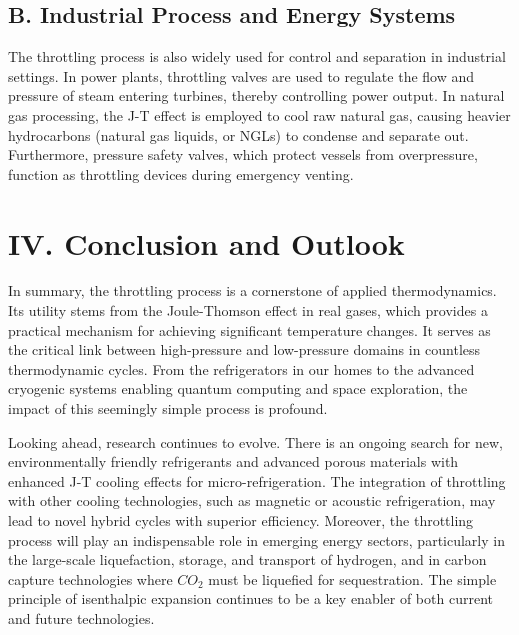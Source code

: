 \documentclass[aps,prl,reprint,groupedaddress]{revtex4-2}
\begin{document}
\subsection{B. Industrial Process and Energy Systems}
The throttling process is also widely used for control and separation in industrial settings. In power plants, throttling valves are used to regulate the flow and pressure of steam entering turbines, thereby controlling power output. In natural gas processing, the J-T effect is employed to cool raw natural gas, causing heavier hydrocarbons (natural gas liquids, or NGLs) to condense and separate out. Furthermore, pressure safety valves, which protect vessels from overpressure, function as throttling devices during emergency venting.

\section{IV. Conclusion and Outlook}
In summary, the throttling process is a cornerstone of applied thermodynamics. Its utility stems from the Joule-Thomson effect in real gases, which provides a practical mechanism for achieving significant temperature changes. It serves as the critical link between high-pressure and low-pressure domains in countless thermodynamic cycles. From the refrigerators in our homes to the advanced cryogenic systems enabling quantum computing and space exploration, the impact of this seemingly simple process is profound.

Looking ahead, research continues to evolve. There is an ongoing search for new, environmentally friendly refrigerants and advanced porous materials with enhanced J-T cooling effects for micro-refrigeration. The integration of throttling with other cooling technologies, such as magnetic or acoustic refrigeration, may lead to novel hybrid cycles with superior efficiency. Moreover, the throttling process will play an indispensable role in emerging energy sectors, particularly in the large-scale liquefaction, storage, and transport of hydrogen, and in carbon capture technologies where $CO_2$ must be liquefied for sequestration. The simple principle of isenthalpic expansion continues to be a key enabler of both current and future technologies.

\end{document}
